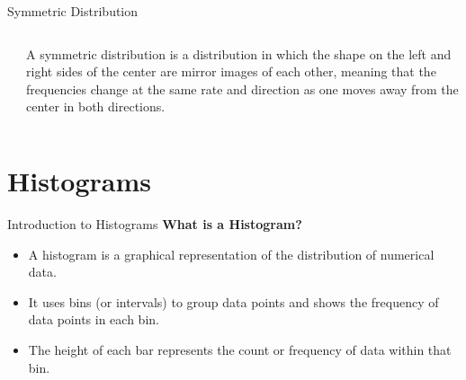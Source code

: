\documentclass[handout]{beamer} %
\begin{document}
\begin{frame}{Symmetric Distribution}


\begin{columns}[T,onlytextwidth]
    \begin{column}{0.75\textwidth}    
    \end{column}

    \hspace{-2em}   
    \begin{column}{0.3\textwidth}
    \footnotesize
     A symmetric distribution is a distribution in which the shape on the left and right sides of the center are mirror images of each other, meaning that the frequencies change at the same rate and direction as one moves away from the center in both directions.
    \end{column}
\end{columns}

\end{frame}



\section{Histograms}

\begin{frame}{Introduction to Histograms}
    \textbf{What is a Histogram?}
    \begin{itemize}
        \item A histogram is a graphical representation of the distribution of numerical data.
        \item It uses bins (or intervals) to group data points and shows the frequency of data points in each bin.
        \item The height of each bar represents the count or frequency of data within that bin.
    \end{itemize}
\end{frame}
\end{document}
